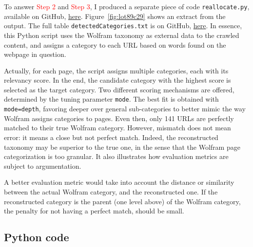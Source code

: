 \documentclass[oneside,10pt]{book}
\begin{document}
To answer \textcolor{red}{Step 2} and \textcolor{red}{Step 3}, I produced a separate piece of code \texttt{reallocate.py}, available on GitHub, 
\href{https://github.com/VincentGranville/Large-Language-Models/blob/main/xllm6/build-taxonomy/reallocate.py}{here}. 
Figure~\ref{fig:lot89c29} shows an extract from the output. The full table \texttt{detectedCategories.txt} is on GitHub,
\href{https://github.com/VincentGranville/Large-Language-Models/blob/main/xllm6/build-taxonomy/detectedCategories.txt}{here}.
In essence, this Python script uses the Wolfram taxonomy as external data to the crawled content, and assigns a category to each URL based on words
 found on the webpage in question. 

Actually, for each page, the script assigns multiple categories, each with its relevancy score. In the end,
the candidate category with the highest score is selected as the target category. Two different scoring mechanisms are offered, 
 determined by the tuning parameter \texttt{mode}. The best fit is obtained with \texttt{mode=\textquotesingle depth\textquotesingle}, favoring deeper over general sub-categories 
 to better mimic the way Wolfram assigns categories to pages.  Even then, only 141 URLs are perfectly
 matched to their true Wolfram category. However, mismatch does not mean error: it means a close but not perfect match. Indeed, the
 reconstructed taxonomy may be superior to the true one, in the sense that the Wolfram page categorization is too granular.
It also illustrates how evaluation metrics are subject to argumentation.

A better evaluation metric would take into account the distance or similarity between the actual Wolfram category, and the reconstructed one. If the
 reconstructed category is the parent (one level above) of the Wolfram category, the penalty for not having a perfect match, should be small. 

 









\subsection{Python code}\label{pyucd}
\end{document}
